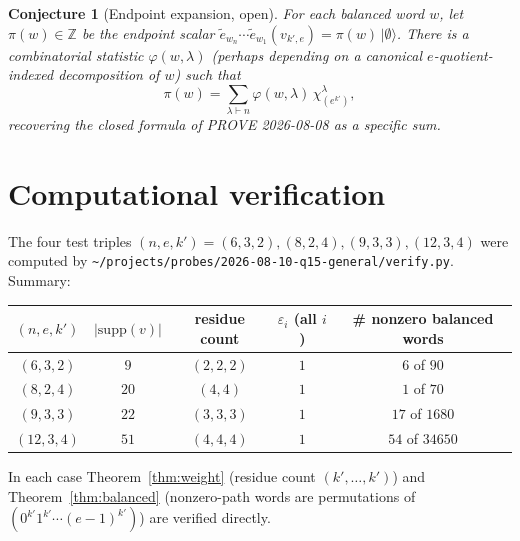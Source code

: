 \documentclass[11pt]{article}
\newtheorem{conjecture}[theorem]{Conjecture}
\theoremstyle{definition}
\newcommand{\te}{\tilde e}
\newcommand{\eps}{\varepsilon}
\begin{document}
\begin{conjecture}[Endpoint expansion, open]\label{conj:endpoint-open}
For each balanced word $w$, let $\pi(w) \in \mathbb{Z}$ be the endpoint scalar
$\te_{w_n}\cdots\te_{w_1}(v_{k',e}) = \pi(w)\,|\emptyset\rangle$. There is a
combinatorial statistic $\varphi(w,\lambda)$ (perhaps depending on a canonical
$e$-quotient-indexed decomposition of $w$) such that
\[
  \pi(w) = \sum_{\lambda \vdash n} \varphi(w,\lambda)\,\chi^\lambda_{(e^{k'})},
\]
recovering the closed formula of PROVE 2026-08-08 as a specific sum.
\end{conjecture}

\section{Computational verification}\label{sec:log}

The four test triples $(n,e,k') = (6,3,2), (8,2,4), (9,3,3), (12,3,4)$ were computed
by \verb|~/projects/probes/2026-08-10-q15-general/verify.py|. Summary:

\begin{center}\small
\begin{tabular}{c|c|c|c|c}
$(n,e,k')$ & $|\mathrm{supp}(v)|$ & residue count & $\eps_i$ (all $i$) &
  \# nonzero balanced words \\\hline
$(6,3,2)$  & $9$  & $(2,2,2)$ & $1$ & $6$ of $90$ \\
$(8,2,4)$  & $20$ & $(4,4)$   & $1$ & $1$ of $70$ \\
$(9,3,3)$  & $22$ & $(3,3,3)$ & $1$ & $17$ of $1680$ \\
$(12,3,4)$ & $51$ & $(4,4,4)$ & $1$ & $54$ of $34650$ \\
\end{tabular}
\end{center}

In each case Theorem~\ref{thm:weight} (residue count $(k',\ldots,k')$) and
Theorem~\ref{thm:balanced} (nonzero-path words are permutations of $(0^{k'} 1^{k'}
\cdots (e-1)^{k'})$) are verified directly.
\end{document}
